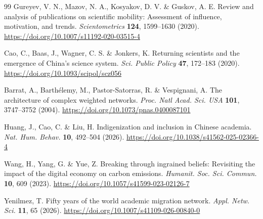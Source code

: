 \begin{thebibliography}{99}
Gureyev, V. N., Mazov, N. A., Kosyakov, D. V. \& Guskov, A. E. Review and analysis of publications on scientific mobility: Assessment of influence, motivation, and trends. \textit{Scientometrics} \textbf{124}, 1599--1630 (2020). \url{https://doi.org/10.1007/s11192-020-03515-4}

Cao, C., Baas, J., Wagner, C. S. \& Jonkers, K. Returning scientists and the emergence of China’s science system. \textit{Sci. Public Policy} \textbf{47}, 172--183 (2020). \url{https://doi.org/10.1093/scipol/scz056}

Barrat, A., Barthélemy, M., Pastor-Satorras, R. \& Vespignani, A. The architecture of complex weighted networks. \textit{Proc. Natl Acad. Sci. USA} \textbf{101}, 3747--3752 (2004). \url{https://doi.org/10.1073/pnas.0400087101}

Huang, J., Cao, C. \& Liu, H. Indigenization and inclusion in Chinese academia. \textit{Nat. Hum. Behav.} \textbf{10}, 492--504 (2026). \url{https://doi.org/10.1038/s41562-025-02366-4}

Wang, H., Yang, G. \& Yue, Z. Breaking through ingrained beliefs: Revisiting the impact of the digital economy on carbon emissions. \textit{Humanit. Soc. Sci. Commun.} \textbf{10}, 609 (2023). \url{https://doi.org/10.1057/s41599-023-02126-7}

Yenilmez, T. Fifty years of the world academic migration network. \textit{Appl. Netw. Sci.} \textbf{11}, 65 (2026). \url{https://doi.org/10.1007/s41109-026-00840-0}

\end{thebibliography}
